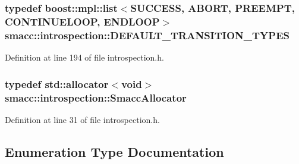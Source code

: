 \subsubsection[{\texorpdfstring{D\+E\+F\+A\+U\+L\+T\+\_\+\+T\+R\+A\+N\+S\+I\+T\+I\+O\+N\+\_\+\+T\+Y\+P\+ES}{DEFAULT_TRANSITION_TYPES}}]{\setlength{\rightskip}{0pt plus 5cm}typedef boost\+::mpl\+::list$<${\bf S\+U\+C\+C\+E\+SS}, {\bf A\+B\+O\+RT}, {\bf P\+R\+E\+E\+M\+PT}, {\bf C\+O\+N\+T\+I\+N\+U\+E\+L\+O\+OP}, {\bf E\+N\+D\+L\+O\+OP}$>$ {\bf smacc\+::introspection\+::\+D\+E\+F\+A\+U\+L\+T\+\_\+\+T\+R\+A\+N\+S\+I\+T\+I\+O\+N\+\_\+\+T\+Y\+P\+ES}}\hypertarget{namespacesmacc_1_1introspection_ac678f3918f2036c45d7d0da7f5afce83}{}\label{namespacesmacc_1_1introspection_ac678f3918f2036c45d7d0da7f5afce83}


Definition at line 194 of file introspection.\+h.

\subsubsection[{\texorpdfstring{Smacc\+Allocator}{SmaccAllocator}}]{\setlength{\rightskip}{0pt plus 5cm}typedef std\+::allocator$<$void$>$ {\bf smacc\+::introspection\+::\+Smacc\+Allocator}}\hypertarget{namespacesmacc_1_1introspection_aa4064aa24887868c6347efc004c08986}{}\label{namespacesmacc_1_1introspection_aa4064aa24887868c6347efc004c08986}


Definition at line 31 of file introspection.\+h.



\subsection{Enumeration Type Documentation}
